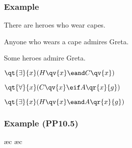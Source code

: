 \begin{frame}
\frametitle{Example}

\begin{earg}
  \item[] There are heroes who wear capes.
  \item[] Anyone who wears a cape admires Greta.
  \item[\therefore] Some heroes admire Greta.
\end{earg}
\bigskip
\begin{earg}
  \item[] $\qt{\exists}{x}(H\qv{x} \eand C\qv{x})$
  \item[] $\qt{\forall}{x}(C\qv{x} \eif A\qr{x}{g})$
  \item[\therefore] $\qt{\exists}{x}(H\qv{x} \eand A\qr{x}{g})$
\end{earg}
\end{frame}

\begin{frame}
\frametitle{Example (PP10.5)}
\footnotesize
\begin{fitchproof}
   \pr{}
   \pr{}
  \open
   
  \ae{c}
  \ae{c}
  \close
\end{fitchproof}
\end{frame}


